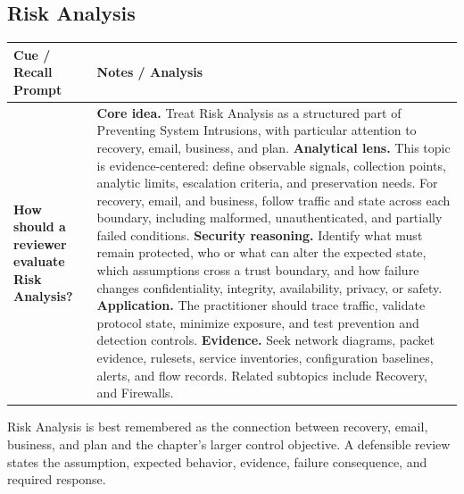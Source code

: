 \documentclass[11pt]{article}
\newcommand{\CornellHeader}{%
\rowcolor{Navy}\color{white}\bfseries Cue / Recall Prompt & \color{white}\bfseries Notes / Analysis\\\hline}
\newcommand{\CornellRow}[2]{%
\cellcolor{CueGray}\RaggedRight\textbf{#1} & \RaggedRight #2\\\hline}
\begin{document}
\subsection*{Risk Analysis}
\begin{longtable}{>{\RaggedRight\arraybackslash}p{}|>{\RaggedRight\arraybackslash}p{}}
\CornellHeader
\CornellRow{How should a reviewer evaluate Risk Analysis?}{\textbf{Core idea.} Treat Risk Analysis as a structured part of Preventing System Intrusions, with particular attention to recovery, email, business, and plan. \textbf{Analytical lens.} This topic is evidence-centered: define observable signals, collection points, analytic limits, escalation criteria, and preservation needs. For recovery, email, and business, follow traffic and state across each boundary, including malformed, unauthenticated, and partially failed conditions. \textbf{Security reasoning.} Identify what must remain protected, who or what can alter the expected state, which assumptions cross a trust boundary, and how failure changes confidentiality, integrity, availability, privacy, or safety. \textbf{Application.} The practitioner should trace traffic, validate protocol state, minimize exposure, and test prevention and detection controls. \textbf{Evidence.} Seek network diagrams, packet evidence, rulesets, service inventories, configuration baselines, alerts, and flow records. Related subtopics include Recovery, and Firewalls.}
\end{longtable}
\begin{topicsummary}
Risk Analysis is best remembered as the connection between recovery, email, business, and plan and the chapter's larger control objective. A defensible review states the assumption, expected behavior, evidence, failure consequence, and required response.
\end{topicsummary}
\end{document}
